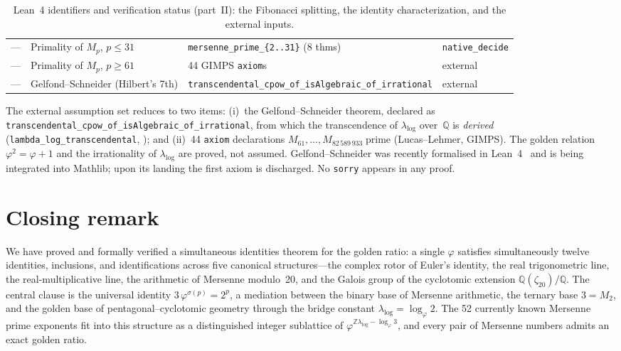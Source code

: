 \documentclass[11pt]{amsart}
\theoremstyle{definition}
\newcommand{\golden}{\varphi}
\newcommand{\Mp}{M_{p}}
\newcommand{\lean}[1]{\texttt{#1}}
\begin{document}
\begin{table}[p]
\begin{tabular}{@{}p{1.0cm}p{3.6cm}p{5.0cm}p{1.5cm}@{}}
\midrule
--- & Primality of $\Mp$, $p\leq 31$ &
  \lean{mersenne\_prime\_\{2..31\}} (8 thms) &
  \texttt{native\allowbreak\_decide} \\
--- & Primality of $\Mp$, $p\geq 61$ & 44 GIMPS \texttt{axiom}s &
  external \\
--- & Gelfond--Schneider (Hilbert's 7th) &
  \lean{transcendental\allowbreak\_cpow\allowbreak\_of\allowbreak\_isAlgebraic\allowbreak\_of\allowbreak\_irrational} & external \\
\bottomrule
\end{tabular}
\caption{Lean~4 identifiers and verification status (part~II): the
Fibonacci splitting, the identity characterization, and the external
inputs.}\label{tab:lean-b}
\end{table}

The external assumption set reduces to two items: (i)~the
Gelfond--Schneider theorem, declared as
\lean{transcendental\_cpow\_of\_isAlgebraic\_of\_irrational}, from which
the transcendence of $\lambda_{\log}$ over~$\mathbb{Q}$ is \emph{derived}
(\lean{lambda\_log\_transcendental}, ); and
(ii)~44 \texttt{axiom} declarations
$M_{61},\ldots,M_{82\,589\,933}\;\text{prime}$ (Lucas--Lehmer, GIMPS).
The golden relation $\golden^{2}=\golden+1$ and the irrationality of
$\lambda_{\log}$ are proved, not assumed. Gelfond--Schneider was
recently formalised in Lean~4~\cite{karatarakis-wiedijk} and is
being integrated into Mathlib; upon its landing the first axiom is
discharged. No \texttt{sorry} appears in any proof.

\section{Closing remark}

We have proved and formally verified a simultaneous identities
theorem for the golden ratio: a single $\golden$ satisfies
simultaneously twelve identities, inclusions, and identifications
across five canonical structures---the complex rotor of Euler's
identity, the real trigonometric line, the real-multiplicative line,
the arithmetic of Mersenne modulo~20, and the Galois group of the
cyclotomic extension $\mathbb{Q}(\zeta_{20})/\mathbb{Q}$.  The central
clause is the universal identity $3\,\golden^{\sigma(p)}=2^{p}$, a
mediation between the binary base of Mersenne arithmetic, the ternary
base $3=M_{2}$, and the golden base of pentagonal--cyclotomic
geometry through the bridge constant $\lambda_{\log}=\log_{\golden}2$.
The 52 currently known Mersenne prime exponents fit into this
structure as a distinguished integer sublattice of
$\golden^{\mathbb{Z}\lambda_{\log}-\log_{\golden} 3}$, and every pair
of Mersenne numbers admits an exact golden ratio.
\end{document}
